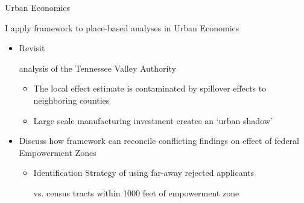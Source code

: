 \documentclass[aspectratio=169]{beamer}
\begin{document}
\begin{frame}{Urban Economics}

    I apply framework to place-based analyses in Urban Economics

    \begin{itemize}
        \item Revisit \begin{citecolor}\citet{Kline_Moretti_2014a}\end{citecolor} analysis of the Tennessee Valley Authority
        
        \begin{itemize}
            \vspace{2.5mm}
            \item The local effect estimate is contaminated by spillover effects to neighboring counties \begin{citecolor}\citep{Kline_Moretti_2014b}\end{citecolor}
            
            \vspace{2.5mm}
            \item Large scale manufacturing investment creates an `urban shadow' \begin{citecolor}\citep{Cuberes_Desmet_Rappaport_2021,Fujita_Krugman_Venables_2001}\end{citecolor}
        \end{itemize}
        
        \vspace{2.5mm}
        \item Discuss how framework can reconcile conflicting findings on effect of federal Empowerment Zones
        
        \begin{itemize}
            \vspace{2.5mm}
            \item Identification Strategy of using far-away rejected applicants \begin{citecolor}\citep{Busso_Gregory_Kline_2013} \end{citecolor} vs. census tracts within 1000 feet of empowerment zone \begin{citecolor}\citep{Neumark_Kolko_2010}\end{citecolor}
        \end{itemize}
    \end{itemize}

\end{frame}
\end{document}
